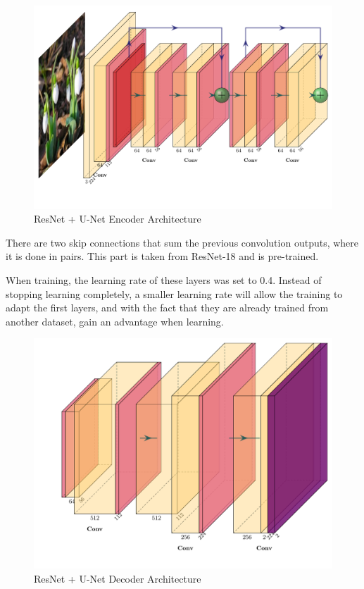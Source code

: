 \documentclass{article}
\begin{document}
\begin{figure}[H]
    \centering
    \includegraphics[width=\linewidth]{resnetUnetEncode.pdf}
    \caption{ResNet + U-Net Encoder Architecture}
\end{figure} 

There are two skip connections that sum the previous convolution outputs, where it is done in pairs. This part is taken from ResNet-18 and is pre-trained.

When training, the learning rate of these layers was set to 0.4. Instead of stopping learning completely, a smaller learning rate will allow the training to adapt the first layers, and with the fact that they are already trained from another dataset, gain an advantage when learning.

\begin{figure}[H]
    \centering
    \includegraphics[width=\linewidth]{resnetUnetDecode.pdf}
    \caption{ResNet + U-Net Decoder Architecture}
\end{figure} 
\end{document}

